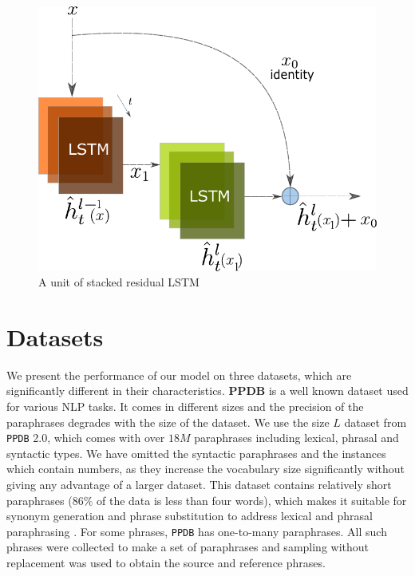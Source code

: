 \begin{figure}
    \centering
    \includegraphics[scale=0.8]{figures/paraphrase/reslstm.pdf}
    \caption[Residual LSTM]{A unit of stacked residual LSTM}
    \label{fig:res}
\end{figure}
 
\section{Datasets}
We present the performance of our model on three datasets, which are significantly different in their characteristics.
\textbf{PPDB} \cite{pavlick2015} is a well known dataset used for various NLP tasks. It comes in different sizes and the precision of the paraphrases degrades with the size of the dataset. We use the size $L$ dataset from \texttt{PPDB} 2.0, which comes with over $18M$ paraphrases including lexical, phrasal and syntactic types. We have omitted the syntactic paraphrases and the instances which contain numbers, as they increase the vocabulary size significantly without giving any advantage of a larger dataset. This dataset contains relatively short paraphrases ($86\%$ of the data is less than four words), which makes it suitable for synonym generation and phrase substitution to address lexical and phrasal paraphrasing \cite{Madnani2010}. For some phrases, \texttt{PPDB} has one-to-many paraphrases. All such phrases were collected to make a set of paraphrases and sampling without replacement was used to obtain the source and reference phrases.
 
